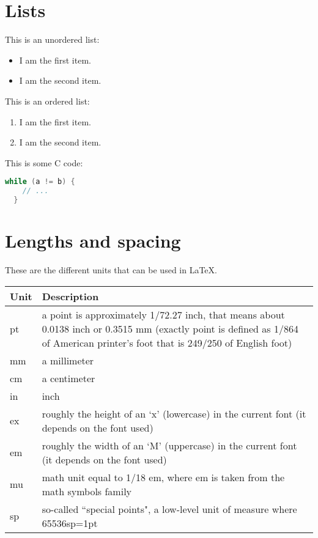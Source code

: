 \documentclass{article}
\begin{document}
\section{Lists}

This is an unordered list:

\begin{itemize}
  \item I am the first item.
  \item I am the second item.
\end{itemize}

This is an ordered list:

\begin{enumerate}
  \item I am the first item.
  \item I am the second item.
\end{enumerate}

This is some C code:

\begin{lstlisting}[language=C]
  while (a != b) {
    // ...
  }
\end{lstlisting}

\section{Lengths and spacing}

These are the different units that can be used in \LaTeX.

\bigskip
\begin{tabular}{| p{} | p{} |}
  \hline
  Unit & Description \\
  \hline
  pt & a point is approximately 1/72.27 inch, that means about 0.0138 inch or
       0.3515 mm (exactly point is defined as 1/864 of American printer's foot
       that is 249/250 of English foot) \\
  mm & a millimeter \\
  cm & a centimeter \\
  in & inch \\
  ex & roughly the height of an `x' (lowercase) in the current font (it depends
       on the font used) \\
  em & roughly the width of an `M' (uppercase) in the current font (it depends
       on the font used) \\
  mu & math unit equal to 1/18 em, where em is taken from the math symbols
       family \\
  sp & so-called ``special points", a low-level unit of measure where
       65536sp=1pt \\
  \hline
\end{tabular}
\bigskip
\end{document}
